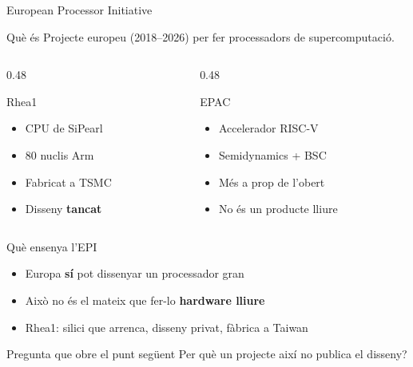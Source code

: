 \documentclass[catalan]{beamer}
\begin{document}
\begin{frame}{European Processor Initiative}
  \begin{block}{Què és}
    Projecte europeu (2018--2026) per fer processadors de supercomputació.
  \end{block}
  \vspace{0.3cm}
  \begin{columns}[T]
    \begin{column}{0.48\textwidth}
      \begin{alertblock}{Rhea1}
        \begin{itemize}
          \item CPU de SiPearl
          \item 80 nuclis Arm
          \item Fabricat a TSMC
          \item Disseny \textbf{tancat}
        \end{itemize}
      \end{alertblock}
    \end{column}
    \begin{column}{0.48\textwidth}
      \begin{exampleblock}{EPAC}
        \begin{itemize}
          \item Accelerador RISC-V
          \item Semidynamics + BSC
          \item Més a prop de l'obert
          \item No és un producte lliure
        \end{itemize}
      \end{exampleblock}
    \end{column}
  \end{columns}
\end{frame}

\begin{frame}{Què ensenya l'EPI}
  \begin{itemize}
    \item Europa \textbf{sí} pot dissenyar un processador gran
    \pause
    \vspace{0.3cm}
    \item Això no és el mateix que fer-lo \textbf{hardware lliure}
    \pause
    \vspace{0.3cm}
    \item Rhea1: silici que arrenca, disseny privat, fàbrica a Taiwan
  \end{itemize}
  \vspace{0.4cm}
  \begin{block}{Pregunta que obre el punt següent}
    Per què un projecte així no publica el disseny?
  \end{block}
\end{frame}
\end{document}
